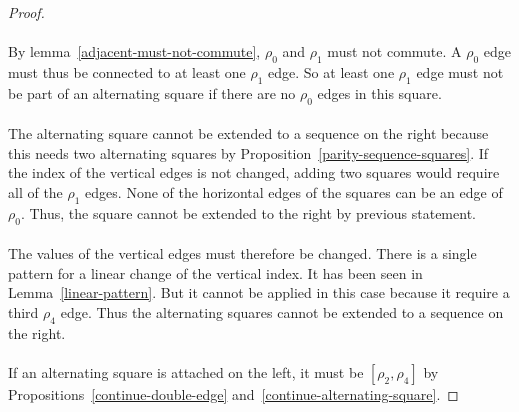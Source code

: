 \begin{proof}
\begin{figure}[H]
\begin{center}
    \caption{}
    \label{proof-5-12}
  \end{center}
\end{figure}

\paragraph{}
By lemma~\ref{adjacent-must-not-commute}, $\rho_0$ and $\rho_1$ must not commute. A $\rho_0$ edge must thus be connected to at least one $\rho_1$ edge. So at least one $\rho_1$ edge must not be part of an alternating square if there are no $\rho_0$ edges in this square.

\paragraph{}
The alternating square cannot be extended to a sequence on the right because this needs two alternating squares by Proposition~\ref{parity-sequence-squares}.  If the index of the vertical edges is not changed, adding two squares would require all of the $\rho_1$ edges. None of the horizontal edges of the squares can be an edge of $\rho_0$. Thus, the square cannot be extended to the right by previous statement.

\paragraph{}
The values of the vertical edges must therefore be changed. There is a single pattern for a linear change of the vertical index. It has been seen in Lemma~\ref{linear-pattern}. But it cannot be applied in this case because it require a third $\rho_4$ edge. Thus the alternating squares cannot be extended to a sequence on the right.

\paragraph{}
If an alternating square is attached on the left, it must be $[\rho_2, \rho_4]$ by Propositions~\ref{continue-double-edge} and~\ref{continue-alternating-square}.


\end{proof}
